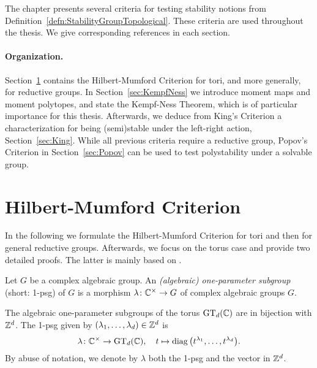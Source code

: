 


The chapter presents several criteria for testing stability notions from Definition~\ref{defn:StabilityGroupTopological}. These criteria are used throughout the thesis. We give corresponding references in each section.

\paragraph{Organization.}
Section~\ref{sec:HilbertMumford} contains the Hilbert-Mumford Criterion for tori, and more generally, for reductive groups. In Section~\ref{sec:KempfNess} we introduce moment maps and moment polytopes, and state the Kempf-Ness Theorem, which is of particular importance for this thesis. Afterwards, we deduce from King's Criterion a characterization for being (semi)stable under the left-right action, Section~\ref{sec:King}. While all previous criteria require a reductive group, Popov's Criterion in Section~\ref{sec:Popov} can be used to test polystability under a solvable group. 




\section{Hilbert-Mumford Criterion} \label{sec:HilbertMumford}

In the following we formulate the Hilbert-Mumford Criterion for tori and then for general reductive groups. Afterwards, we focus on the torus case and provide two detailed proofs. The latter is mainly based on \cite[Appendix~A]{DiscretePaper}.

\medskip

Let $G$ be a complex algebraic group. An \emph{(algebraic) one-parameter subgroup} (short: 1-psg) of $G$ is a morphism $\lambda \colon \mathbb C^\times \to G$ of complex algebraic groups $G$.

\begin{example}\label{ex:OnePSGsGTd}
	The algebraic one-parameter subgroups of the torus $\operatorname{GT}_d(\mathbb C)$ are in bijection with $\mathbb Z^d$. The 1-psg given by $(\lambda_1,\ldots,\lambda_d) \in \mathbb Z^d$ is
	\begin{equation}\label{eq:OnePSG-GTd}
			\lambda \colon \mathbb C^\times \to \operatorname{GT}_d(\mathbb C) , \quad t \mapsto \operatorname{diag} \big( t^{\lambda_1}, \ldots, t^{\lambda_d} \big) .
	\end{equation}
	By abuse of notation, we denote by $\lambda$ both the 1-psg and the vector in $\mathbb Z^d$.
	\hfill\exSymbol
\end{example}

